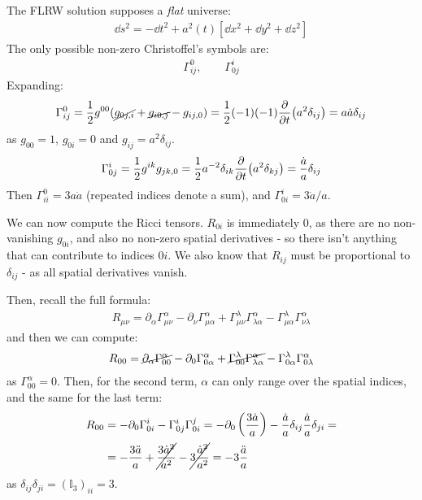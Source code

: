 \documentclass[../template.tex]{subfiles}
\begin{document}
\medskip

The FLRW solution supposes a \textit{flat} universe:
\begin{align*}
    \dd{s^2} = -\dd{t^2} + a^2(t) [\dd{x^2} + \dd{y^2} + \dd{z^2}]
\end{align*} 
The only possible non-zero Christoffel's symbols are:
\begin{align*}
    \Gamma_{ij}^0, \qquad \Gamma_{0j}^i
\end{align*}
Expanding:
\begin{align*}
    \Gamma_{ij}^0 = \frac{1}{2} g^{00} (\cancel{g_{0j,i}} + \cancel{g_{i0,j} }- g_{ij,0}) = \frac{1}{2}(-1)(-1) \pdv{t} (a^2 \delta_{ij})  = a\dot{a} \delta_{ij}
\end{align*}
as $g_{00} = 1$, $g_{0i} = 0$ and $g_{ij} = a^2 \delta_{ij}$.
\begin{align*}
    \Gamma_{0j}^i = \frac{1}{2} g^{ik} g_{jk,0} = \frac{1}{2} a^{-2} \delta_{ik} \pdv{t} (a^2 \delta_{kj}) = \frac{\dot{a}}{a} \delta_{ij}   
\end{align*}
Then $\Gamma^0_{i i} = 3 a \dot{a}$ (repeated indices denote a sum), and $\Gamma_{0i}^i = 3 \dot{a}/a$.

We can now compute the Ricci tensors. $R_{0i}$ is immediately $0$, as there are no non-vanishing $g_{0i}$, and also no non-zero spatial derivatives - so there isn't anything that can contribute to indices $0i$. We also know that $R_{ij}$ must be proportional to $\delta_{ij}$ - as all spatial derivatives vanish.

Then, recall the full formula:
\begin{align*}
    R_{\mu \nu} = \partial_\alpha \Gamma^\alpha_{\mu \nu} - \partial_\nu \Gamma_{\mu \alpha}^\alpha + \Gamma_{\mu \nu}^\lambda \Gamma^\alpha_{\lambda \alpha} - \Gamma^\lambda_{\mu \alpha} \Gamma^\alpha_{\nu \lambda}
\end{align*}
and then we can compute:
\begin{align*}
    R_{00} =\cancel{ \partial_\alpha \Gamma^\alpha_{00}} - \partial_0 \Gamma_{0 \alpha}^\alpha + \cancel{\Gamma_{00}^\lambda \Gamma_{\lambda \alpha}^\alpha }- \Gamma_{0 \alpha}^\lambda \Gamma_{0 \lambda}^\alpha
\end{align*}
as $\Gamma_{00}^\alpha = 0$. Then, for the second term, $\alpha$ can only range over the spatial indices, and the same for the last term:
\begin{align*}
    R_{00} &= -\partial_0 \Gamma_{0i}^i - \Gamma_{0j}^i \Gamma_{0i}^j = - \partial_0 \left(\frac{3 \dot{a}}{a} \right) - \frac{\dot{a}}{a} \delta_{ij} \frac{\dot{a}}{a} \delta_{ji} =\\
    &= -\frac{3 \ddot{a}}{a} + \cancel{\frac{3 \dot{a}^2}{a^2}} - \cancel{3 \frac{\dot{a}^2}{a^2}} = - 3\frac{\ddot{a}}{a}    
\end{align*}  
as $\delta_{ij} \delta_{ji} = (\mathbb{I}_3)_{i i} = 3$.
\end{document}
